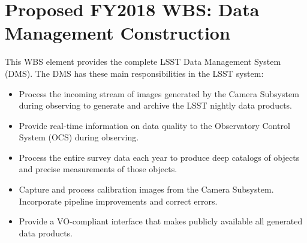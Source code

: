 \section{Proposed FY2018 WBS: Data Management Construction}
\label{sec:wbslist}

This WBS element provides the complete LSST Data Management System (DMS). The
DMS has these main responsibilities in the LSST system:

\begin{itemize}

 \item{Process the incoming stream of images generated by the Camera Subsystem
 during observing to generate and archive the LSST nightly data products.}
 
 \item{Provide real-time information on data quality to the Observatory Control
 System (OCS) during observing.}
 
 \item{Process the entire survey data each year to produce deep catalogs of
 objects and precise measurements of those objects.}
 
 \item{Capture and process calibration images from the Camera Subsystem.
 Incorporate pipeline improvements and correct errors.}
 
 \item{Provide a VO-compliant interface that makes publicly available all
 generated data products.}

\end{itemize}
